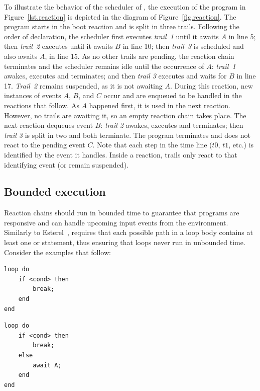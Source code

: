 To illustrate the behavior of the scheduler of \CEU, the execution of the 
program in Figure~\ref{lst.reaction} is depicted in the diagram of 
Figure~\ref{fig.reaction}.
%
The program starts in the boot reaction and is split in three trails.
Following the order of declaration, the scheduler first executes \emph{trail~1} 
until it awaits $A$ in line 5;
then \emph{trail~2} executes until it awaits $B$ in line 10;
then \emph{trail~3} is scheduled and also awaits $A$, in line 15.
%
As no other trails are pending, the reaction chain terminates and the scheduler 
remains idle until the occurrence of $A$:
\emph{trail~1} awakes, executes and terminates;
and then \emph{trail 3} executes and waits for $B$ in line 17.
\emph{Trail~2} remains suspended, as it is not awaiting $A$.
%
During this reaction, new instances of events $A$, $B$, and $C$ occur and are 
enqueued to be handled in the reactions that follow.
%
As $A$ happened first, it is used in the next reaction.
However, no trails are awaiting it, so an empty reaction chain takes place.
%
The next reaction dequeues event $B$:
\emph{trail 2} awakes, executes and terminates;
then \emph{trail 3} is split in two and both terminate.
%
The program terminates and does not react to the pending event $C$.
%
Note that each step in the time line ($t0$, $t1$, etc.) is identified by the 
event it handles.
Inside a reaction, trails only react to that identifying event (or remain 
suspended).

\subsection{Bounded execution}

Reaction chains should run in bounded time to guarantee that programs are 
responsive and can handle upcoming input events from the environment.
Similarly to Esterel~\cite{esterel.ieee91}, \CEU requires that each possible 
path in a loop body contains at least one  or  
statement, thus ensuring that loops never run in unbounded time.
%
Consider the examples that follow:

\nopagebreak
\noindent
\begin{minipage}[t]{0.45\linewidth}
\begin{lstlisting}
loop do
    if <cond> then
        break;
    end
end
\end{lstlisting}
\end{minipage}
%
\begin{minipage}[t]{0.45\linewidth}
\begin{lstlisting}
loop do
    if <cond> then
        break;
    else
        await A;
    end
end
\end{lstlisting}
\end{minipage}

